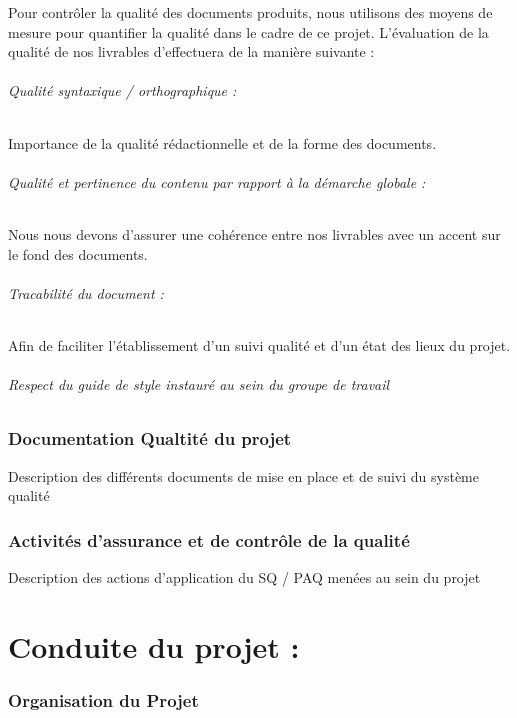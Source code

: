 \documentclass[a4paper, 18pt]{article}
\begin{document}
Pour contrôler la qualité des documents produits, nous utilisons des moyens de mesure pour quantifier la qualité dans le cadre de ce projet. L'évaluation de la qualité de nos livrables d'effectuera de la manière suivante :

\paragraph*{Qualité syntaxique / orthographique :} Importance de la qualité rédactionnelle et de la forme des documents.
\paragraph*{Qualité et pertinence du contenu par rapport à la démarche globale :} Nous nous devons d’assurer une cohérence entre nos livrables avec un accent sur le fond des documents.
\paragraph*{Tracabilité du document :} Afin de faciliter l’établissement d’un suivi qualité et d’un état des lieux du projet.
\paragraph*{Respect du guide de style instauré au sein du groupe de travail}

\section{Documentation Qualtité du projet}

Description des différents documents de mise en place et de suivi du système qualité

\section{Activités d'assurance et de contrôle de la qualité }

Description des actions d'application du SQ / PAQ menées au sein du projet 

\part{Conduite du projet : }

\section{Organisation du Projet }
\end{document}
